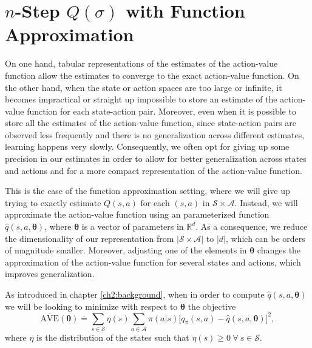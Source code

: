 \section{$n$-Step $Q(\sigma)$ with Function Approximation}

On one hand, tabular representations of the estimates of the action-value function allow the estimates to converge to the exact action-value function.
On the other hand, when the state or action spaces are too large or infinite, it becomes impractical or straight up impossible to store an estimate of the action-value function for each state-action pair.
Moreover, even when it is possible to store all the estimates of the action-value function, since state-action pairs are observed less frequently and there is no generalization across different estimates, learning happens very slowly.
Consequently, we often opt for giving up some precision in our estimates in order to allow for better generalization across states and actions and for a more compact representation of the action-value function. 

This is the case of the function approximation setting, where we will give up trying to exactly estimate $Q(s,a)$ for each $(s,a)$ in $\mathcal{S} \times \mathcal{A}$.
Instead, we will approximate the action-value function using an parameterized function $\hat{q}(s,a,\boldsymbol\theta)$, where $\boldsymbol\theta$ is a vector of parameters in $\mathbb{R}^d$.
As a consequence, we reduce the dimensionality of our representation from $|\mathcal{S} \times \mathcal{A}|$ to $|d|$, which can be orders of magnitude smaller.
Moreover, adjusting one of the elements in $\boldsymbol\theta$ changes the approximation of the action-value function for several states and actions, which improves generalization.

As introduced in chapter \ref{ch2:background}, when in order to compute $\hat{q}(s,a,\boldsymbol\theta)$ we will be looking to minimize with respect to $\boldsymbol\theta$ the objective
%
\begin{equation}
\label{eq:av_error3}
\overline{\text{AVE}}(\boldsymbol{\theta}) \overset{.}{=}
	\sum_{s \in \mathcal{S}} \eta(s) \sum_{a \in \mathcal{A}} \pi(a|s) \big[ q_\pi(s,a) 
    - \hat{q}(s,a, \boldsymbol{\theta}) \big]^2,
\end{equation}
%
where $\eta$ is the distribution of the states such that $\eta(s) \geq 0 \ \forall \ s \in \mathcal{S}$.


